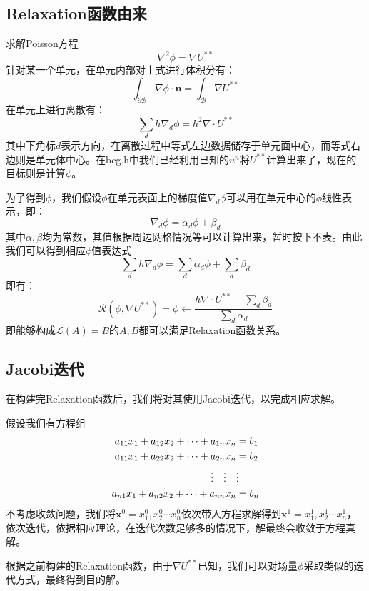 \documentclass[lang=cn,11pt,a4paper]{elegantpaper}
\begin{document}
\subsection{Relaxation函数由来}
求解Poisson方程
\begin{equation}
    \nabla^2 \phi = \nabla U^{**}
\end{equation}
针对某一个单元，在单元内部对上式进行体积分有：
\begin{equation}
    \int_{\partial \mathscr{B}}\nabla \phi \cdot \mathbf{n} = \int_{\mathscr{B}}\nabla U^{**}
\end{equation}
在单元上进行离散有：
\begin{equation}
    \sum_d h\nabla_d \phi =h^2 \nabla \cdot U^{**}
\end{equation}
其中下角标$d$表示方向，在离散过程中等式左边数据储存于单元面中心，而等式右边则是单元体中心。在bcg.h中我们已经利用已知的$u^n$将$U^{**}$计算出来了，现在的目标则是计算$\phi$。\par
为了得到$\phi$，我们假设$\phi$在单元表面上的梯度值$\nabla_d \phi$可以用在单元中心的$\phi$线性表示，即：
\begin{equation}
    \nabla_d \phi = \alpha_d \phi + \beta_d
\end{equation}
其中$\alpha, \beta$均为常数，其值根据周边网格情况等可以计算出来，暂时按下不表。由此我们可以得到相应$\phi$值表达式
\begin{equation}
    \sum_d h\nabla_d \phi = \sum_d\alpha_d\phi + \sum_d\beta_d
\end{equation}
即有：
\begin{equation}
    \mathscr{R}(\phi, \nabla U^{**})=\phi \leftarrow \frac{h\nabla\cdot U^{**}-\sum_d\beta_d}{\sum_d\alpha_d}
\end{equation}
即能够构成$\mathscr{L}(A) = B$的$A,B$都可以满足Relaxation函数关系。
\subsection{Jacobi迭代}
在构建完Relaxation函数后，我们将对其使用Jacobi迭代，以完成相应求解。\par
假设我们有方程组
\begin{align}
    a_{11}x_1+a_{12}x_2+\cdots+a_{1n}x_n & =b_1\notag\\
    a_{11}x_1+a_{22}x_2+\cdots+a_{2n}x_n & =b_2\\
    \vdots \quad \vdots \quad& \vdots\notag \\
    a_{n1}x_1+a_{n2}x_2+\cdots+a_{nn}x_n & =b_n\notag
\end{align}
不考虑收敛问题，我们将$\mathbf{x}^0={x_1^0,x_2^0\cdots x_n^0}$依次带入方程求解得到$\mathbf{x}^1={x_1^1,x_2^1\cdots x_n^1}$，依次迭代，依据相应理论，在迭代次数足够多的情况下，解最终会收敛于方程真解。\par
根据之前构建的Relaxation函数，由于$\nabla U^{**}$已知，我们可以对场量$\phi$采取类似的迭代方式，最终得到目的解。
\end{document}
